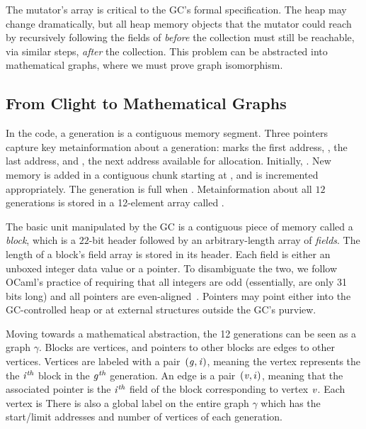 The mutator's  array is critical to the GC's formal specification.
The heap may change dramatically, but all heap memory objects 
that the mutator could reach by recursively
following the fields of  \emph{before} the collection 
must still be reachable, via similar steps, \emph{after} the collection.  This problem can be abstracted 
into mathematical graphs, where we must prove graph isomorphism.

\subsection{From Clight to Mathematical Graphs}
\label{sec:movetomathgraph}
In the code, a generation is a contiguous memory segment. 
Three pointers capture key metainformation about a generation:
 marks the first address, ,
the last address, and , the next address available for 
allocation.  
Initially, . 
New memory is added in a contiguous chunk starting 
at , and  is
incremented appropriately. 
The generation is full when .
Metainformation about all $12$ generations is stored in 
a 12-element array called .
	
The basic unit manipulated by the GC is a
contiguous piece of memory called a \emph{block}, which is a 
$22$-bit header followed by an arbitrary-length array of \emph{fields}.
The length of a block's field array is stored in its header.
Each field is either an unboxed integer data value or a pointer. 
To disambiguate the two,
we follow OCaml's practice of requiring that all integers are odd 
(essentially, are only 31 bits long) and all pointers are even-aligned~\cite{realworldocaml}. Pointers may point either into the GC-controlled heap or at external structures outside the GC's purview.

Moving towards a mathematical abstraction, the 12 generations can be seen
as a graph $\gamma$. Blocks are
vertices, and pointers to other blocks are edges to other
vertices. Vertices are labeled with
a pair~$(\mathit{g}, \mathit{i})$, meaning the vertex represents the 
the $\mathit{i}^{\textit{th}}$ block in the $\mathit{g}^{\textit{th}}$ generation. 
An edge is a pair~$(\mathit{v}, i)$, meaning that 
the associated pointer is the $\mathit{i}^{\textit{th}}$ field of the block
corresponding to vertex $\mathit{v}$. 
Each vertex is  There is also a global label on the entire graph $\gamma$ which has the
start/limit addresses and number of vertices of each generation. 

